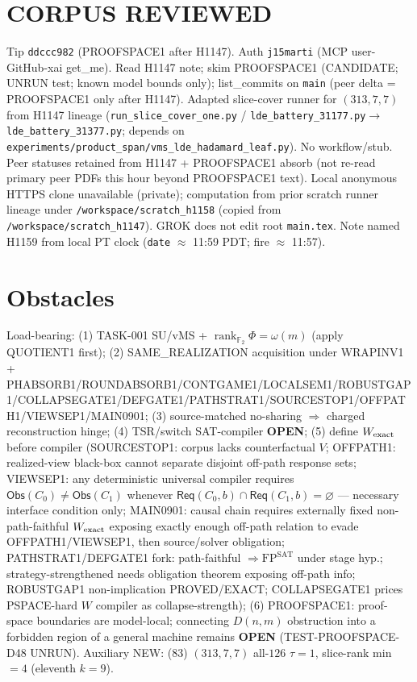 \documentclass[11pt]{article}
\begin{document}
\section*{CORPUS REVIEWED}
Tip \texttt{ddccc982} (PROOFSPACE1 after H1147). Auth \texttt{j15marti} (MCP user-GitHub-xai get\_me).
Read H1147 note; skim PROOFSPACE1 (CANDIDATE; UNRUN test; known model bounds only);
list\_commits on \texttt{main} (peer delta = PROOFSPACE1 only after H1147).
Adapted slice-cover runner for $(313,7,7)$ from H1147 lineage
(\texttt{run\_slice\_cover\_one.py} / \texttt{lde\_battery\_31177.py}$\to$\texttt{lde\_battery\_31377.py};
depends on \texttt{experiments/product\_span/vms\_lde\_hadamard\_leaf.py}).
No workflow/stub. Peer statuses retained from H1147 + PROOFSPACE1 absorb
(not re-read primary peer PDFs this hour beyond PROOFSPACE1 text).
Local anonymous HTTPS clone unavailable (private);
computation from prior scratch runner lineage under \texttt{/workspace/scratch\_h1158}
(copied from \texttt{/workspace/scratch\_h1147}).
GROK does not edit root \texttt{main.tex}.
Note named H1159 from local PT clock (\texttt{date} $\approx$ 11:59 PDT; fire $\approx$ 11:57).

\section*{Obstacles}
Load-bearing: (1) TASK-001 SU/vMS + $\operatorname{rank}_{\mathbb F_2}\Phi=\omega(m)$ (apply QUOTIENT1 first);
(2) SAME\_REALIZATION acquisition under WRAPINV1 + PHABSORB1/ROUNDABSORB1/CONTGAME1/LOCALSEM1/ROBUSTGAP1/COLLAPSEGATE1/DEFGATE1/PATHSTRAT1/SOURCESTOP1/OFFPATH1/VIEWSEP1/MAIN0901;
(3) source-matched no-sharing $\Rightarrow$ charged reconstruction hinge;
(4) TSR/switch SAT-compiler \textbf{OPEN};
(5) define $W_{\rm exact}$ before compiler (SOURCESTOP1: corpus lacks counterfactual $V$;
OFFPATH1: realized-view black-box cannot separate disjoint off-path response sets;
VIEWSEP1: any deterministic universal compiler requires $\mathsf{Obs}(C_0)\ne\mathsf{Obs}(C_1)$
whenever $\mathsf{Req}(C_0,b)\cap\mathsf{Req}(C_1,b)=\varnothing$ --- necessary interface condition only;
MAIN0901: causal chain requires externally fixed non-path-faithful $W_{\rm exact}$ exposing
exactly enough off-path relation to evade OFFPATH1/VIEWSEP1, then source/solver obligation;
PATHSTRAT1/DEFGATE1 fork: path-faithful $\Rightarrow\mathrm{FP}^{\mathrm{SAT}}$ under stage hyp.;
strategy-strengthened needs obligation theorem exposing off-path info;
ROBUSTGAP1 non-implication PROVED/EXACT; COLLAPSEGATE1 prices PSPACE-hard $W$ compiler as collapse-strength);
(6) PROOFSPACE1: proof-space boundaries are model-local; connecting $D(n,m)$ obstruction into a
forbidden region of a general machine remains \textbf{OPEN} (TEST-PROOFSPACE-D48 UNRUN).
Auxiliary NEW: (83) $(313,7,7)$ all-$126$ $\tau{=}1$, slice-rank min $=4$ (eleventh $k{=}9$).
\end{document}
